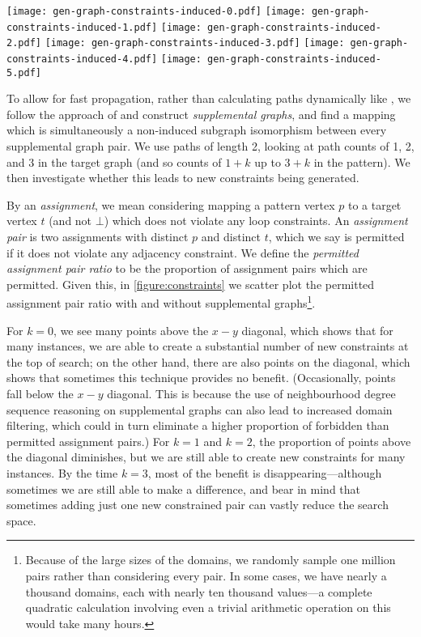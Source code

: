 \documentclass[letterpaper]{article}
\newcommand{\citet}[1]{\citeauthor{#1} \shortcite{#1}}
\theoremstyle{definition}
\begin{document}
\begin{figure*}[tb]
    \centering
    \texttt{[image: gen-graph-constraints-induced-0.pdf]}
    \texttt{[image: gen-graph-constraints-induced-1.pdf]}
    \texttt{[image: gen-graph-constraints-induced-2.pdf]}
    \texttt{[image: gen-graph-constraints-induced-3.pdf]}
    \texttt{[image: gen-graph-constraints-induced-4.pdf]}
    \texttt{[image: gen-graph-constraints-induced-5.pdf]}

    \caption{For the induced problem, the proportion of pairs of assignments from the filtered
    domains which are not permitted simultaneously, without path constraints on the $x$-axis and
    with path constraints on the $y$-axis, for increasing values of $k$.}\label{figure:constraints}
\end{figure*}

To allow for fast propagation, rather than calculating paths dynamically like
\citet{DBLP:conf/cp/AudemardLMGP14}, we follow the approach of \citet{DBLP:conf/cp/McCreeshP15} and
construct \emph{supplemental graphs}, and find a mapping which is simultaneously a non-induced subgraph
isomorphism between every supplemental graph pair. We use paths of length 2, looking at path counts
of 1, 2, and 3 in the target graph (and so counts of $1 + k$ up to $3 + k$ in the pattern).  We then
investigate whether this leads to new constraints being generated.

By an \emph{assignment}, we mean considering mapping a pattern vertex $p$ to a target vertex $t$ (and not
$\bot$) which does not violate any loop constraints. An \emph{assignment pair} is two assignments with
distinct $p$ and distinct $t$, which we say is permitted if it does not violate any adjacency
constraint. We define the \emph{permitted assignment pair ratio} to be the proportion of assignment pairs
which are permitted.  Given this, in \cref{figure:constraints} we scatter plot the permitted assignment
pair ratio with and without supplemental graphs\footnote{Because of the large sizes of the domains,
we randomly sample one million pairs rather than considering every pair. In some cases, we have
nearly a thousand domains, each with nearly ten thousand values---a complete quadratic calculation
involving even a trivial arithmetic operation on this would take many hours.}.

For $k = 0$, we see many points above the $x-y$ diagonal, which shows that for many instances, we
are able to create a substantial number of new constraints at the top of search; on the other hand,
there are also points on the diagonal, which shows that sometimes this technique provides no
benefit. (Occasionally, points fall below the $x-y$ diagonal.  This is because the use of
neighbourhood degree sequence reasoning on supplemental graphs can also lead to increased domain
filtering, which could in turn eliminate a higher proportion of forbidden than permitted assignment
pairs.) For $k = 1$ and $k = 2$, the proportion of points above the diagonal diminishes, but we are
still able to create new constraints for many instances. By the time $k = 3$, most of the benefit is
disappearing---although sometimes we are still able to make a difference, and bear in mind that
sometimes adding just one new constrained pair can vastly reduce the search space.
\end{document}
